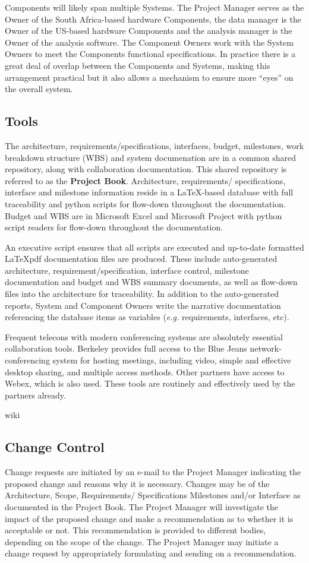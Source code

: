 \documentclass[preprint]{aastex}
\begin{document}
Components will likely span multiple Systems. The Project
Manager serves as the Owner of the South Africa-based hardware Components, the data
manager is the Owner of the US-based hardware Components and the analysis manager is 
the Owner of the analysis software.  The Component Owners work with the System Owners 
to meet the Components functional specifications.  In practice there is a great deal of overlap
between the Components and Systems, making this arrangement practical but it also allows
a mechanism to ensure more ``eyes'' on the overall system.

\subsection{Tools}
The architecture, requirements/specifications, interfaces, budget, milestones, work breakdown structure
(WBS) and system documenation are in a common shared repository, along with collaboration
documentation.  This shared repository is referred to as the \textbf{Project Book}.  Architecture, requirements/ 
specifications, interface and milestone information reside in a \LaTeX-based database with full traceability
and python scripts for flow-down throughout the documentation.  Budget and WBS are in Microsoft
Excel and Microsoft Project with python script readers for flow-down throughout the documentation.

An executive script ensures that all scripts are executed and up-to-date formatted \LaTeX pdf documentation
files are produced.  These include auto-generated architecture, requirement/specification, 
interface control, milestone documentation and budget and WBS summary documents, as well as
flow-down files into the architecture for traceability. 
In addition to the auto-generated reports, System and  Component Owners write the narrative 
documentation referencing the database items as variables ({\em e.g.} requirements, interfaces, etc).

Frequent telecons with modern conferencing systems are absolutely essential collaboration tools.
Berkeley provides full access to the Blue Jeans network-conferencing system for hosting meetings, including
video, simple and effective desktop sharing, and multiple access methods.  Other partners have access to Webex,
which is also used.  These tools are routinely and effectively used by the partners already.

wiki

\subsection{Change Control}
Change requests are initiated by an e-mail to the Project Manager indicating the proposed change
and reasons why it is necessary.  Changes may be of the Architecture, Scope, Requirements/ Specifications
Milestones and/or Interface as documented in the Project Book.  The Project Manager will investigate the 
impact of the proposed change and make a recommendation as to whether it is acceptable or not.  This 
recommendation is provided to different bodies, depending on the scope of the change.  The Project Manager 
may initiate a change request by appropriately formulating and sending on a recommendation.
\end{document}
